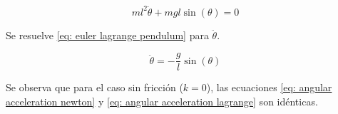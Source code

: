 \begin{equation}
 ml^2\ddot{\theta} + m g l \sin(\theta) = 0
 \label{eq: euler lagrange pendulum}
\end{equation}

Se resuelve \eqref{eq: euler lagrange pendulum} para $\ddot{\theta}$.

\begin{equation}
 \ddot{\theta} = - \dfrac{g}{l} \sin (\theta)
 \label{eq: angular acceleration lagrange}
\end{equation}


Se observa que para el caso sin fricción ($k = 0$), las ecuaciones 
\eqref{eq: angular acceleration newton} y 
\eqref{eq: angular acceleration lagrange}
son idénticas.
